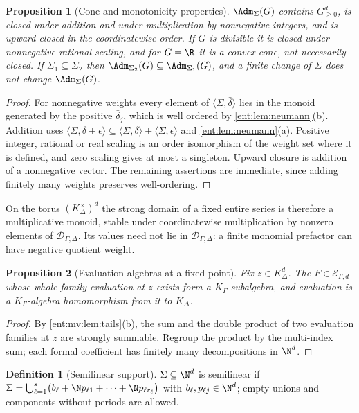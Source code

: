\documentclass[11pt]{article}
\theoremstyle{plain}
\theoremstyle{plain}
\newtheorem{proposition}[proposition]{Proposition}
\theoremstyle{plain}
\theoremstyle{definition}
\newtheorem{definition}[definition]{Definition}
\theoremstyle{definition}
\theoremstyle{definition}
\theoremstyle{definition}
\theoremstyle{remark}
\newcommand{\K}{K_\Gamma}\newcommand{\KD}{K_\Delta}
\newcommand{\Dom}{\mathcal D_{\Gamma,\Delta}}
\newcommand{\inner}[2]{\langle#1,#2\rangle}
\begin{document}
\begin{proposition}[Cone and monotonicity properties]\label{ent:mv:prop:cone}
$\Adm_\Sigma(G)$ contains $G_{\ge0}^d$, is closed under addition and under
multiplication by nonnegative integers, and is upward closed in the
coordinatewise order. If $G$ is divisible it is closed under nonnegative
rational scaling, and for $G=\R$ it is a convex cone, not necessarily closed.
If $\Sigma_1\subseteq\Sigma_2$ then $\Adm_{\Sigma_2}(G)\subseteq
\Adm_{\Sigma_1}(G)$, and a finite change of $\Sigma$ does not change
$\Adm_\Sigma(G)$.
\end{proposition}
\begin{proof}
For nonnegative weights every element of $\inner\Sigma{\bar\delta}$ lies in the
monoid generated by the positive $\bar\delta_j$, which is well ordered by
\cref{ent:lem:neumann}(b). Addition uses
$\inner\Sigma{\bar\delta+\bar\epsilon}\subseteq\inner\Sigma{\bar\delta}+
\inner\Sigma{\bar\epsilon}$ and \cref{ent:lem:neumann}(a). Positive integer,
rational or real scaling is an order isomorphism of the weight set where it
is defined, and zero scaling gives at most a singleton. Upward closure is
addition of a nonnegative vector. The remaining assertions are immediate,
since adding finitely many weights preserves well-ordering.
\end{proof}

On the torus $(\KD^\times)^d$ the strong domain of a fixed entire series is
therefore a multiplicative monoid, stable under coordinatewise
multiplication by nonzero elements of $\Dom$. Its values need not lie in
$\Dom$: a finite monomial prefactor can have negative quotient weight.

\begin{proposition}[Evaluation algebras at a fixed point]
\label{ent:mv:prop:algebra}
Fix $z\in\KD^d$. The $F\in\mathcal E_{\Gamma,d}$ whose whole-family evaluation
at $z$ exists form a $\K$-subalgebra, and evaluation is a $\K$-algebra
homomorphism from it to $\KD$.
\end{proposition}
\begin{proof}
By \cref{ent:mv:lem:tails}(b), the sum and the double product of two
evaluation families at $z$ are strongly summable. Regroup the product by the
multi-index sum; each formal coefficient has finitely many decompositions in
$\N^d$.
\end{proof}

\begin{definition}[Semilinear support]\label{ent:mv:def:semilinear}
$\Sigma\subseteq\N^d$ is semilinear if
$\Sigma=\bigcup_{\ell=1}^s\bigl(b_\ell+\N p_{\ell1}+\cdots+\N p_{\ell
r_\ell}\bigr)$ with $b_\ell,p_{\ell j}\in\N^d$; empty unions and components
without periods are allowed.
\end{definition}
\end{document}
